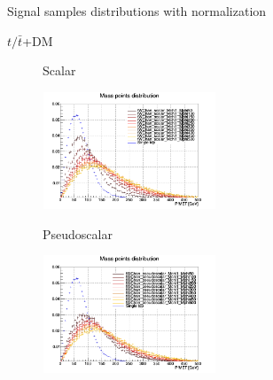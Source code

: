 \documentclass[8pt]{beamer}
\begin{document}
\begin{frame}{Signal samples distributions with normalization}
\justifying
\begin{block}{\centering $t/\bar t$+DM}\end{block} \vspace{-10pt}
\begin{figure}[htbp]
\centering
\begin{minipage}[b]{.49\textwidth}
\vspace{-5pt}
\begin{block}{\centering Scalar}\end{block}
\begin{center}
\includegraphics[width=5.2cm, height=3.5cm]{figs/singleTopScalarMETNorm.png}
\end{center}
\end{minipage}
\begin{minipage}[b]{.02\textwidth}\end{minipage}
\begin{minipage}[b]{.49\textwidth}
\vspace{-5pt}
\begin{block}{\centering Pseudoscalar}\end{block}
\begin{center}
\includegraphics[width=5.2cm, height=3.5cm]{figs/singleTopPseudoMETNorm.png}
\end{center}
\end{minipage}
\end{figure} \vfill


\end{frame}
\end{document}
